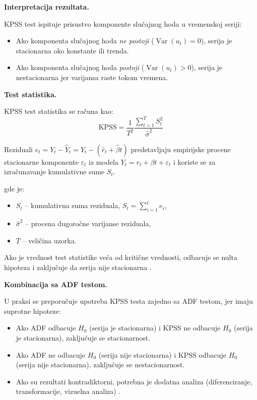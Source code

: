 \documentclass[12pt]{article}
\begin{document}
\bigskip

\noindent \textbf{Interpretacija rezultata.}

KPSS test ispituje prisustvo komponente slučajnog hoda u vremenskoj seriji:

\begin{itemize}
    \item Ako komponenta slučajnog hoda \textit{ne postoji} (\(\operatorname{Var}(u_t)=0\)), serija je stacionarna oko konstante ili trenda.
    \item Ako komponenta slučajnog hoda \textit{postoji} (\(\operatorname{Var}(u_t) > 0\)), serija je nestacionarna jer varijansa raste tokom vremena.
\end{itemize}

\bigskip

\noindent \textbf{Test statistika.}


KPSS test statistika se računa kao:
\[
\text{KPSS} = \frac{1}{T^2} \frac{\sum_{t=1}^{T} S_t^2}{\hat{\sigma}^2}
\]

Reziduali $e_t = Y_t - \hat{Y}_t = Y_t - (\hat{r}_t + \hat{\beta} t)$ predstavljaju empirijske procene stacionarne komponente $\varepsilon_t$ iz modela $Y_t = r_t + \beta t + \varepsilon_t$ i koriste se za izračunavanje kumulativne sume $S_t$.


\smallskip
\noindent gde je:
\begin{itemize}
    \item $S_t$ – kumulativna suma reziduala, $S_t = \sum_{i=1}^{t} e_i$,
    \item $\hat{\sigma}^2$ – procena dugoročne varijanse reziduala,
    \item $T$ – veličina uzorka.
\end{itemize}

\noindent Ako je vrednost test statistike veća od kritične vrednosti, odbacuje se nulta hipoteza i zaključuje da serija nije stacionarna \cite{kpss1992}.

\bigskip

\noindent \textbf{Kombinacija sa ADF testom.}

U praksi se preporučuje upotreba KPSS testa zajedno sa ADF testom, jer imaju suprotne hipoteze:

\begin{itemize}
    \item Ako ADF odbacuje $H_0$ (serija je stacionarna) i KPSS ne odbacuje $H_0$ (serija je stacionarna), zaključuje se stacionarnost.
    \item Ako ADF ne odbacuje $H_0$ (serija nije stacionarna) i KPSS odbacuje $H_0$ (serija nije stacionarna), zaključuje se nestacionarnost.
    \item Ako su rezultati kontradiktorni, potrebna je dodatna analiza (diferenciranje, transformacije, vizuelna analiza) \cite{dickey1979, kpss1992}.
\end{itemize}
\end{document}
